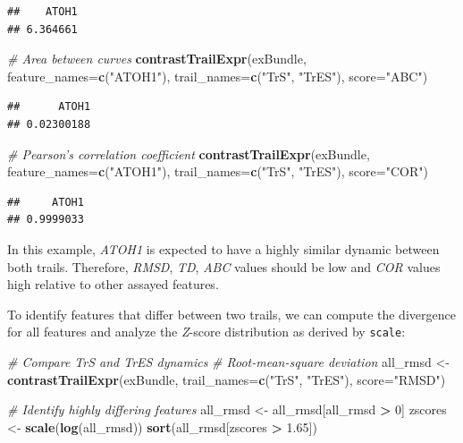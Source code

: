 \documentclass[]{book}
\newenvironment{Shaded}{\begin{snugshade}}{\end{snugshade}}
\newcommand{\KeywordTok}[1]{\textcolor[rgb]{0.13,0.29,0.53}{\textbf{#1}}}
\newcommand{\DataTypeTok}[1]{\textcolor[rgb]{0.13,0.29,0.53}{#1}}
\newcommand{\DecValTok}[1]{\textcolor[rgb]{0.00,0.00,0.81}{#1}}
\newcommand{\FloatTok}[1]{\textcolor[rgb]{0.00,0.00,0.81}{#1}}
\newcommand{\StringTok}[1]{\textcolor[rgb]{0.31,0.60,0.02}{#1}}
\newcommand{\CommentTok}[1]{\textcolor[rgb]{0.56,0.35,0.01}{\textit{#1}}}
\newcommand{\OperatorTok}[1]{\textcolor[rgb]{0.81,0.36,0.00}{\textbf{#1}}}
\newcommand{\NormalTok}[1]{#1}
\theoremstyle{definition}
\theoremstyle{definition}
\theoremstyle{definition}
\theoremstyle{remark}
\begin{document}
\begin{verbatim}
##    ATOH1 
## 6.364661
\end{verbatim}

\begin{Shaded}
\begin{Highlighting}[]
\CommentTok{# Area between curves}
\KeywordTok{contrastTrailExpr}\NormalTok{(exBundle, }\DataTypeTok{feature_names=}\KeywordTok{c}\NormalTok{(}\StringTok{"ATOH1"}\NormalTok{), }
                  \DataTypeTok{trail_names=}\KeywordTok{c}\NormalTok{(}\StringTok{"TrS"}\NormalTok{, }\StringTok{"TrES"}\NormalTok{), }\DataTypeTok{score=}\StringTok{"ABC"}\NormalTok{)}
\end{Highlighting}
\end{Shaded}

\begin{verbatim}
##      ATOH1 
## 0.02300188
\end{verbatim}

\begin{Shaded}
\begin{Highlighting}[]
\CommentTok{# Pearson's correlation coefficient}
\KeywordTok{contrastTrailExpr}\NormalTok{(exBundle, }\DataTypeTok{feature_names=}\KeywordTok{c}\NormalTok{(}\StringTok{"ATOH1"}\NormalTok{), }
                  \DataTypeTok{trail_names=}\KeywordTok{c}\NormalTok{(}\StringTok{"TrS"}\NormalTok{, }\StringTok{"TrES"}\NormalTok{), }\DataTypeTok{score=}\StringTok{"COR"}\NormalTok{)}
\end{Highlighting}
\end{Shaded}

\begin{verbatim}
##     ATOH1 
## 0.9999033
\end{verbatim}

In this example, \emph{ATOH1} is expected to have a highly similar
dynamic between both trails. Therefore, \emph{RMSD}, \emph{TD},
\emph{ABC} values should be low and \emph{COR} values high relative to
other assayed features.

To identify features that differ between two trails, we can compute the
divergence for all features and analyze the \emph{Z}-score distribution
as derived by \texttt{scale}:

\begin{Shaded}
\begin{Highlighting}[]
\CommentTok{# Compare TrS and TrES dynamics}
\CommentTok{# Root-mean-square deviation}
\NormalTok{all_rmsd <-}\StringTok{ }\KeywordTok{contrastTrailExpr}\NormalTok{(exBundle, }
                              \DataTypeTok{trail_names=}\KeywordTok{c}\NormalTok{(}\StringTok{"TrS"}\NormalTok{, }\StringTok{"TrES"}\NormalTok{), }\DataTypeTok{score=}\StringTok{"RMSD"}\NormalTok{)}

\CommentTok{# Identify highly differing features}
\NormalTok{all_rmsd <-}\StringTok{ }\NormalTok{all_rmsd[all_rmsd }\OperatorTok{>}\StringTok{ }\DecValTok{0}\NormalTok{]}
\NormalTok{zscores <-}\StringTok{ }\KeywordTok{scale}\NormalTok{(}\KeywordTok{log}\NormalTok{(all_rmsd))}
\KeywordTok{sort}\NormalTok{(all_rmsd[zscores }\OperatorTok{>}\StringTok{ }\FloatTok{1.65}\NormalTok{])}
\end{Highlighting}
\end{Shaded}
\end{document}
